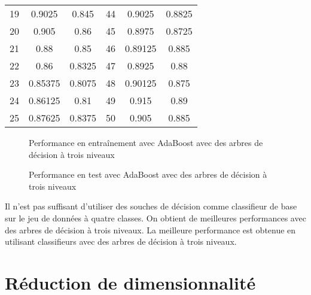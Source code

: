 \documentclass[french, twoside=semi, headings=normal]{scrartcl}
\begin{document}
\begin{table}
\begin{tabular}{S S S S S S}
			19 & 0.9025 & 0.845 & 44 & 0.9025 & 0.8825 \\
			20 & 0.905 & 0.86 & 45 & 0.8975 & 0.8725 \\
			21 & 0.88 & 0.85 & 46 & 0.89125 & 0.885 \\
			22 & 0.86 & 0.8325 & 47 & 0.8925 & 0.88 \\
			23 & 0.85375 & 0.8075 & 48 & 0.90125 & 0.875 \\
			24 & 0.86125 & 0.81 & 49 & 0.915 & 0.89 \\
			25 & 0.87625 & 0.8375 & 50 & 0.905 & 0.885 \\
		\bottomrule
	\end{tabular}
	\label{tab:adaboost_scores_with_decision_trees}
\end{table}
\begin{figure}
	\centering
	
	\caption{Performance en entraînement avec AdaBoost avec des arbres de décision à trois niveaux}
	\label{fig:adaboost_train_scores_with_decision_trees}
\end{figure}
\begin{figure}
	\centering
	
	\caption{Performance en test avec AdaBoost avec des arbres de décision à trois niveaux}
	\label{fig:adaboost_test_scores_with_decision_trees}
\end{figure}

Il n'est pas suffisant d'utiliser des souches de décision comme classifieur de base sur le jeu de données à quatre classes. On obtient de meilleures performances avec des arbres de décision à trois niveaux. La meilleure performance est obtenue en utilisant  classifieurs avec des arbres de décision à trois niveaux.

\section{Réduction de dimensionnalité}
\end{document}
